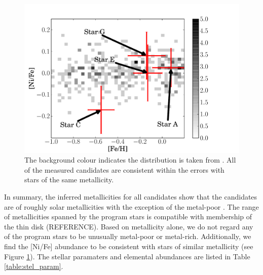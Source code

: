 %
%
%
%
%


\begin{figure}[h] %
   \centering
   \includegraphics[width=1\textwidth]{chapter3/plots/abund_chiaki.pdf} 
   \caption{The background colour indicates the distribution is taken from \citet{2006ApJ...653.1145K}. All of the measured candidates are consistent within the errors with stars of the same metallicity.}
   \label{fig:kobayashi06}
\end{figure}

In summary, the inferred metallicities for all candidates show that the candidates are of roughly solar metallicities with the exception of the metal-poor \starc. The range of metallicities spanned by the program stars is compatible with membership of the thin disk (REFERENCE). Based on metallicity alone, we do not regard any of the program stars to be unusually metal-poor or metal-rich.  Additionally, we find the [Ni/Fe] abundance to be consistent with stars of similar metallicity (see Figure \ref{fig:kobayashi06}). The stellar paramaters and elemental abundances are listed in Table \ref{table:stel_param}.

